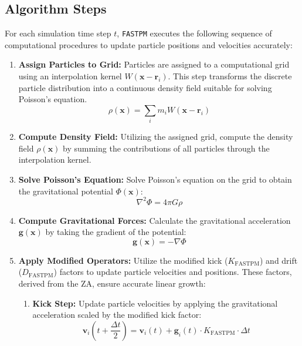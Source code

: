\subsection{Algorithm Steps}
For each simulation time step $t$, \texttt{FASTPM} executes the following sequence of computational procedures to update particle positions and velocities accurately:

\begin{enumerate}
    \item \textbf{Assign Particles to Grid:} 
    \label{fastpm:assign-grid}
    Particles are assigned to a computational grid using an interpolation kernel $W(\mathbf{x} - \mathbf{r}_i)$. This step transforms the discrete particle distribution into a continuous density field suitable for solving Poisson's equation.
    \[
    \rho(\mathbf{x}) = \sum_i m_i W(\mathbf{x} - \mathbf{r}_i)
    \]
    
    \item \textbf{Compute Density Field:}
    Utilizing the assigned grid, compute the density field $\rho(\mathbf{x})$ by summing the contributions of all particles through the interpolation kernel.
    
    \item \textbf{Solve Poisson's Equation:}
    \label{fastpm:poisson}
    Solve Poisson's equation on the grid to obtain the gravitational potential $\Phi(\mathbf{x})$:
    \[
    \nabla^2 \Phi = 4\pi G \rho
    \]
    
    \item \textbf{Compute Gravitational Forces:}
    Calculate the gravitational acceleration $\mathbf{g}(\mathbf{x})$ by taking the gradient of the potential:
    \[
    \mathbf{g}(\mathbf{x}) = -\nabla \Phi
    \]
    
    \item \textbf{Apply Modified Operators:}
    \label{fastpm:modified-kick-drift}
    Utilize the modified kick ($K_{\text{FASTPM}}$) and drift ($D_{\text{FASTPM}}$) factors to update particle velocities and positions. These factors, derived from the ZA, ensure accurate linear growth:
    
    \begin{enumerate}
        \item \textbf{Kick Step:}
        Update particle velocities by applying the gravitational acceleration scaled by the modified kick factor:
        \[
        \mathbf{v}_i\left(t + \frac{\Delta t}{2}\right) = \mathbf{v}_i(t) + \mathbf{g}_i(t) \cdot K_{\text{FASTPM}} \cdot \Delta t
        \]
        

\end{enumerate}
\end{enumerate}
